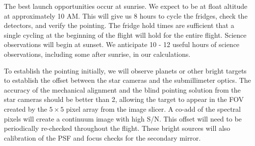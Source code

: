 

The best launch opportunities occur at sunrise.  We expect to be at float altitude at approximately 10 AM.  This will give us 8 hours to cycle the fridges, check the detectors, and verify the pointing.  The fridge hold times are sufficient that a single cycling at the beginning of the flight will hold for the entire flight.  
Science observations will begin at sunset.  We anticipate 10 - 12 useful hours of science observations, including some after sunrise, in our calculations.

To establish the pointing initially, we will observe planets or other bright targets to establish the offset between the star cameras and the submillimeter optics.  The accuracy of the mechanical alignment and the blind pointing solution from the star cameras should be better than 2\arcmin, allowing the target to appear in the FOV created by the $5\times5$ pixel array from the image slicer.  A co-add of the spectral pixels will create a continuum image with high S/N.  This offset will need to be periodically re-checked throughout the flight.  These bright sources will also calibration of the PSF and focus checks for the secondary mirror.


